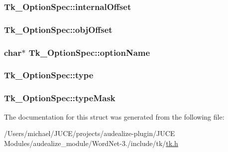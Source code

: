 \subsubsection[{\texorpdfstring{internal\+Offset}{internalOffset}}]{ Tk\+\_\+\+Option\+Spec\+::internal\+Offset}\hypertarget{struct_tk___option_spec_a72913a7f86eabff79019bd2aed7107d6}{}\label{struct_tk___option_spec_a72913a7f86eabff79019bd2aed7107d6}
\subsubsection[{\texorpdfstring{obj\+Offset}{objOffset}}]{ Tk\+\_\+\+Option\+Spec\+::obj\+Offset}\hypertarget{struct_tk___option_spec_a5855e59f7bbf2ec2d99adc22e846338f}{}\label{struct_tk___option_spec_a5855e59f7bbf2ec2d99adc22e846338f}
\subsubsection[{\texorpdfstring{option\+Name}{optionName}}]{\setlength{\rightskip}{0pt plus 5cm}char$\ast$ Tk\+\_\+\+Option\+Spec\+::option\+Name}\hypertarget{struct_tk___option_spec_a0f4f4cebd2da47c933b0dfbe835ac17f}{}\label{struct_tk___option_spec_a0f4f4cebd2da47c933b0dfbe835ac17f}
\subsubsection[{\texorpdfstring{type}{type}}]{ Tk\+\_\+\+Option\+Spec\+::type}\hypertarget{struct_tk___option_spec_ab061f1e0a600adc3853c2417016154b9}{}\label{struct_tk___option_spec_ab061f1e0a600adc3853c2417016154b9}
\subsubsection[{\texorpdfstring{type\+Mask}{typeMask}}]{ Tk\+\_\+\+Option\+Spec\+::type\+Mask}\hypertarget{struct_tk___option_spec_a0b457348947bf8a05918905810f02ed9}{}\label{struct_tk___option_spec_a0b457348947bf8a05918905810f02ed9}


The documentation for this struct was generated from the following file\+:\begin{DoxyCompactItemize}
\item 
/\+Users/michael/\+J\+U\+C\+E/projects/audealize-\/plugin/\+J\+U\+C\+E Modules/audealize\+\_\+module/\+Word\+Net-\/3./include/tk/\hyperlink{tk_8h}{tk.\+h}\end{DoxyCompactItemize}
